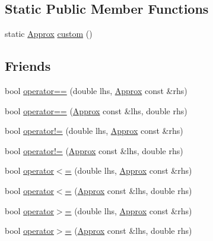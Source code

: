 \subsection*{Static Public Member Functions}
\begin{DoxyCompactItemize}
\item 
static \hyperlink{class_catch_1_1_detail_1_1_approx}{Approx} \hyperlink{class_catch_1_1_detail_1_1_approx_aaf86dc0ee92272ac2d9839197a07951d}{custom} ()
\end{DoxyCompactItemize}
\subsection*{Friends}
\begin{DoxyCompactItemize}
\item 
bool \hyperlink{class_catch_1_1_detail_1_1_approx_ac766f044f1c63f0c5997982baefd9049}{operator==} (double lhs, \hyperlink{class_catch_1_1_detail_1_1_approx}{Approx} const \&rhs)
\item 
bool \hyperlink{class_catch_1_1_detail_1_1_approx_a35999631e6cef569f9da9f3fa910db22}{operator==} (\hyperlink{class_catch_1_1_detail_1_1_approx}{Approx} const \&lhs, double rhs)
\item 
bool \hyperlink{class_catch_1_1_detail_1_1_approx_a83b3763569a7ecc143c335b630be0e47}{operator!=} (double lhs, \hyperlink{class_catch_1_1_detail_1_1_approx}{Approx} const \&rhs)
\item 
bool \hyperlink{class_catch_1_1_detail_1_1_approx_a7497ef839f8026cc0edd6269a80f3e09}{operator!=} (\hyperlink{class_catch_1_1_detail_1_1_approx}{Approx} const \&lhs, double rhs)
\item 
bool \hyperlink{class_catch_1_1_detail_1_1_approx_aa2bfad80c8c138eac1f0b56910a7d3f2}{operator$<$=} (double lhs, \hyperlink{class_catch_1_1_detail_1_1_approx}{Approx} const \&rhs)
\item 
bool \hyperlink{class_catch_1_1_detail_1_1_approx_a75c9382b61421ffab3559c3506182d8f}{operator$<$=} (\hyperlink{class_catch_1_1_detail_1_1_approx}{Approx} const \&lhs, double rhs)
\item 
bool \hyperlink{class_catch_1_1_detail_1_1_approx_a4e60095c615a0e6bdd6e8663cd24090b}{operator$>$=} (double lhs, \hyperlink{class_catch_1_1_detail_1_1_approx}{Approx} const \&rhs)
\item 
bool \hyperlink{class_catch_1_1_detail_1_1_approx_adaba11ee9aabb4d51d4855f09aa7f7df}{operator$>$=} (\hyperlink{class_catch_1_1_detail_1_1_approx}{Approx} const \&lhs, double rhs)
\end{DoxyCompactItemize}


